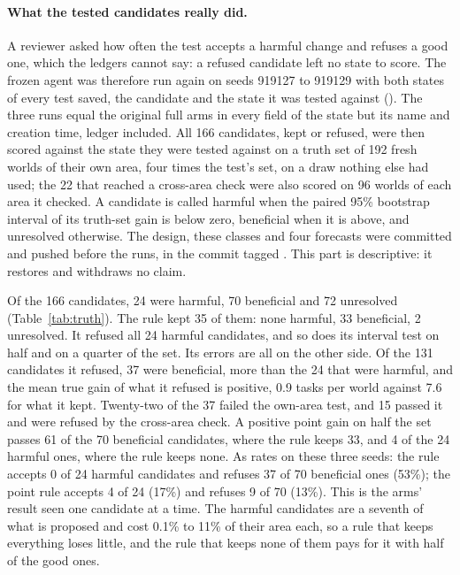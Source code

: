 \documentclass[11pt]{article}
\begin{document}
\paragraph{What the tested candidates really did.} A reviewer asked how often the test accepts a harmful change and refuses a good one, which the ledgers cannot say: a refused candidate left no state to score. The frozen agent was therefore run again on seeds 919127 to 919129 with both states of every test saved, the candidate and the state it was tested against (). The three runs equal the original full arms in every field of the state but its name and creation time, ledger included. All 166 candidates, kept or refused, were then scored against the state they were tested against on a truth set of 192 fresh worlds of their own area, four times the test's set, on a draw nothing else had used; the 22 that reached a cross-area check were also scored on 96 worlds of each area it checked. A candidate is called harmful when the paired 95\% bootstrap interval of its truth-set gain is below zero, beneficial when it is above, and unresolved otherwise. The design, these classes and four forecasts were committed and pushed before the runs, in the commit tagged . This part is descriptive: it restores and withdraws no claim.

Of the 166 candidates, 24 were harmful, 70 beneficial and 72 unresolved (Table~\ref{tab:truth}). The rule kept 35 of them: none harmful, 33 beneficial, 2 unresolved. It refused all 24 harmful candidates, and so does its interval test on half and on a quarter of the set. Its errors are all on the other side. Of the 131 candidates it refused, 37 were beneficial, more than the 24 that were harmful, and the mean true gain of what it refused is positive, 0.9 tasks per world against 7.6 for what it kept. Twenty-two of the 37 failed the own-area test, and 15 passed it and were refused by the cross-area check. A positive point gain on half the set passes 61 of the 70 beneficial candidates, where the rule keeps 33, and 4 of the 24 harmful ones, where the rule keeps none. As rates on these three seeds: the rule accepts 0 of 24 harmful candidates and refuses 37 of 70 beneficial ones (53\%); the point rule accepts 4 of 24 (17\%) and refuses 9 of 70 (13\%). This is the arms' result seen one candidate at a time. The harmful candidates are a seventh of what is proposed and cost 0.1\% to 11\% of their area each, so a rule that keeps everything loses little, and the rule that keeps none of them pays for it with half of the good ones.
\end{document}
